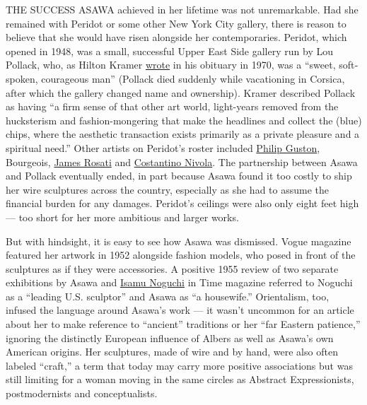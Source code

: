 THE SUCCESS ASAWA achieved in her lifetime was not unremarkable. Had she
remained with Peridot or some other New York City gallery, there is
reason to believe that she would have risen alongside her
contemporaries. Peridot, which opened in 1948, was a small, successful
Upper East Side gallery run by Lou Pollack, who, as Hilton Kramer
\href{https://www.nytimes.com/1970/12/06/archives/an-ambience-all-too-rare.html}{wrote}
in his obituary in 1970, was a ``sweet, soft‐spoken, courageous man''
(Pollack died suddenly while vacationing in Corsica, after which the
gallery changed name and ownership). Kramer described Pollack as having
``a firm sense of that other art world, light-years removed from the
hucksterism and fashion-mongering that make the headlines and collect
the (blue) chips, where the aesthetic transaction exists primarily as a
private pleasure and a spiritual need.'' Other artists on Peridot's
roster included
\href{https://www.nytimes.com/2017/05/16/t-magazine/art/philip-guston-venice.html}{Philip
Guston}, Bourgeois,
\href{https://www.nytimes.com/1988/02/27/obituaries/james-rosati-76-sculptor-noted-for-monumental-works-is-dead.html}{James
Rosati} and
\href{https://www.nytimes.com/1988/05/07/obituaries/costantino-nivola-76-a-sculptor-of-public-and-small-scale-works.html}{Costantino
Nivola}. The partnership between Asawa and Pollack eventually ended, in
part because Asawa found it too costly to ship her wire sculptures
across the country, especially as she had to assume the financial burden
for any damages. Peridot's ceilings were also only eight feet high ---
too short for her more ambitious and larger works.

But with hindsight, it is easy to see how Asawa was dismissed. Vogue
magazine featured her artwork in 1952 alongside fashion models, who
posed in front of the sculptures as if they were accessories. A positive
1955 review of two separate exhibitions by Asawa and
\href{https://www.nytimes.com/2020/02/25/arts/design/isamu-noguchi-midtown-installation.html}{Isamu
Noguchi} in Time magazine referred to Noguchi as a ``leading U.S.
sculptor'' and Asawa as ``a housewife.'' Orientalism, too, infused the
language around Asawa's work --- it wasn't uncommon for an article about
her to make reference to ``ancient'' traditions or her ``far Eastern
patience,'' ignoring the distinctly European influence of Albers as well
as Asawa's own American origins. Her sculptures, made of wire and by
hand, were also often labeled ``craft,'' a term that today may carry
more positive associations but was still limiting for a woman moving in
the same circles as Abstract Expressionists, postmodernists and
conceptualists.

